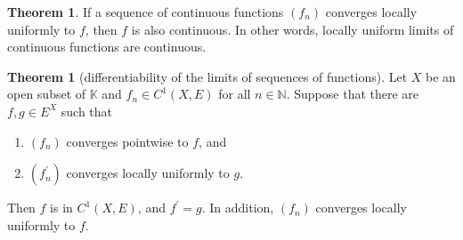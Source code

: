 \documentclass[12pt,a4paper]{book}
\newenvironment{prooff}{{\noindent\it\textcolor{cyan!40!black}{Proof}:}\,}{\par}
\newcommand{\p}{^{\prime}}
\newenvironment{enu}{\begin{enumerate}[(1)]}{\end{enumerate}}
\theoremstyle{definition}
\newtheorem{theo}[defn]{Theorem}
\begin{document}
\begin{theo}
    If a sequence of continuous functions $\left(f_n\right)$ converges locally uniformly to $f$, then $f$ is also continuous. In other words, locally uniform limits of continuous functions are continuous.
\end{theo}
\begin{theo}[differentiability of the limits of sequences of functions]
    Let $X$ be an open subset of $\mathbb{K}$ and $f_n \in C^1(X, E)$ for all $n \in \mathbb{N}$. Suppose that there are $f, g \in E^X$ such that
\begin{enu}     
    \item $\left(f_n\right)$ converges pointwise to $f$, and
    \item $\left(f_n^{\prime}\right)$ converges locally uniformly to $g$.
\end{enu}
    Then $f$ is in $C^1(X, E)$, and $f^{\prime}=g$. In addition, $\left(f_n\right)$ converges locally uniformly to $f$.
\end{theo}
    

\end{document}
